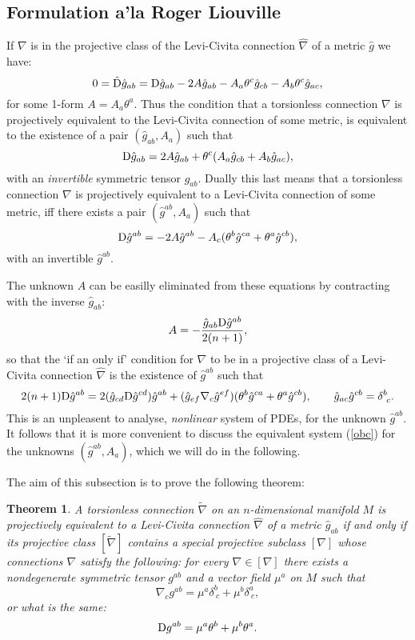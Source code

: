 \documentclass[letterpaper]{amsart}
\newtheorem{theorem}{Theorem}[section]
\theoremstyle{definition}
\theoremstyle{remark}
\newcommand{\be}{\begin{equation}}
\newcommand{\ee}{\end{equation}}
\newcommand{\D}{{\rm D}}
\begin{document}
\subsection{Formulation a'la Roger Liouville}
If $\nabla$ is in the projective class of the Levi-Civita connection
$\hat{\nabla}$ of a metric $\hat{g}$ we have: 
$$0=\hat{\D}\hat{g}_{ab}=\D\hat{g}_{ab}-2A\hat{g}_{ab}-A_a\theta^c\hat{g}_{cb}-A_b\theta^c\hat{g}_{ac},$$
for some 1-form $A=A_a\theta^a$. Thus the condition that a 
torsionless connection $\nabla$ is projectively equivalent to the 
Levi-Civita connection of some metric, is equivalent to the existence
of a pair $(\hat{g}_{ab},A_a)$ such that 
$$\D\hat{g}_{ab}=2A\hat{g}_{ab}+\theta^c(A_a\hat{g}_{cb}+A_b\hat{g}_{ac}),$$
with an \emph{invertible} symmetric tensor $\hat{g}_{ab}$. Dually this
last means that  
a 
torsionless connection $\nabla$ is projectively equivalent to a
Levi-Civita connection of some metric, iff there exists 
a pair $(\hat{g}^{ab},A_a)$ such that
\be 
\D\hat{g}^{ab}=-2A\hat{g}^{ab}-A_c(\theta^b\hat{g}^{ca}+\theta^a\hat{g}^{cb}),\label{obc}
\ee
with an invertible $\hat{g}^{ab}$. 

The unknown $A$ can be easilly eliminated from these equations by
contracting with the inverse $\hat{g}_{ab}$:
$$A=-\frac{\hat{g}_{ab}\D\hat{g}^{ab}}{2(n+1)},$$
so that the `if an only if' condition for $\nabla$ to be in a
projective class of a Levi-Civita connection $\hat{\nabla}$ is the 
existence of $\hat{g}^{ab}$ such that 
$$2(n+1)\D\hat{g}^{ab}=2(\hat{g}_{cd}\D\hat{g}^{cd})\hat{g}^{ab}+(\hat{g}_{ef}\nabla_c\hat{g}^{ef})(\theta^b\hat{g}^{ca}+\theta^a\hat{g}^{cb}),\quad\quad
\hat{g}_{ac}\hat{g}^{cb}=\delta^b_{~c}.$$
This is an unpleasent to analyse, \emph{nonlinear} system of PDEs,  
for the unknown $\hat{g}^{ab}$. It follows that it is more convenient
to discuss the equivalent system (\ref{obc}) for the unknowns $(\hat{g}^{ab},A_a)$, which we will do in the following. 

The aim of this subsection is to prove the following theorem:
\begin{theorem}\label{tth}
A torsionless connection $\tilde{\nabla}$ on an $n$-dimensional
manifold $M$ is projectively equivalent to a
Levi-Civita connection $\hat{\nabla}$ of a metric $\hat{g}_{ab}$ if
and only if its projective class $[\tilde{\nabla}]$ contains a
\emph{special} projective subclass $[\nabla]$ whose connections $\nabla$ satisfy the
following:
for every $\nabla\in[\nabla]$ there exists a nondegenerate symmetric  tensor $g^{ab}$ and a vector field
$\mu^a$ on $M$ such that  
$$\nabla_c g^{ab}=\mu^a\delta^b_{~c}+\mu^b\delta^a_{~c},$$
or what is the same:
\be 
\D g^{ab}=\mu^a\theta^b+\mu^b\theta^a.\label{obc1}\ee   
\end{theorem}
\end{document}
